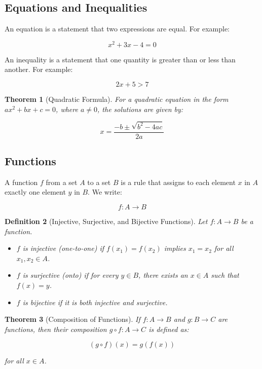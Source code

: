 \documentclass[12pt]{article}
\newif\ifDarkMode
\newcommand{\eqcolor}[1]{\ifDarkMode\textcolor{draculaPurple}{#1}\else#1\fi}
\newcommand{\varcolor}[1]{\ifDarkMode\textcolor{draculaGreen}{#1}\else#1\fi}
\newtheorem{theorem}{Theorem}[section]
\newtheorem{definition}[theorem]{Definition}
\begin{document}
\subsection{\textcolor{draculaYellow}{Equations and Inequalities}}

An equation is a statement that two expressions are equal. For example:

\[
\eqcolor{x^2 + 3x - 4 = 0}
\]

An inequality is a statement that one quantity is greater than or less than another. For example:

\[
\eqcolor{2x + 5 > 7}
\]

\begin{theorem}[Quadratic Formula]
For a quadratic equation in the form $\eqcolor{ax^2 + bx + c = 0}$, where $\varcolor{a \neq 0}$, the solutions are given by:

\[
\eqcolor{x = \frac{-b \pm \sqrt{b^2 - 4ac}}{2a}}
\]
\end{theorem}

\subsection{\textcolor{draculaYellow}{Functions}}

A function $\varcolor{f}$ from a set $\varcolor{A}$ to a set $\varcolor{B}$ is a rule that assigns to each element $\varcolor{x}$ in $\varcolor{A}$ exactly one element $\varcolor{y}$ in $\varcolor{B}$. We write:

\[
\eqcolor{f: A \to B}
\]

\begin{definition}[Injective, Surjective, and Bijective Functions]
Let $\varcolor{f: A \to B}$ be a function.
\begin{itemize}
    \item $\varcolor{f}$ is injective (one-to-one) if $\eqcolor{f(x_1) = f(x_2)}$ implies $\eqcolor{x_1 = x_2}$ for all $\varcolor{x_1, x_2 \in A}$.
    \item $\varcolor{f}$ is surjective (onto) if for every $\varcolor{y \in B}$, there exists an $\varcolor{x \in A}$ such that $\eqcolor{f(x) = y}$.
    \item $\varcolor{f}$ is bijective if it is both injective and surjective.
\end{itemize}
\end{definition}

\begin{theorem}[Composition of Functions]
If $\varcolor{f: A \to B}$ and $\varcolor{g: B \to C}$ are functions, then their composition $\varcolor{g \circ f: A \to C}$ is defined as:

\[
\eqcolor{(g \circ f)(x) = g(f(x))}
\]

for all $\varcolor{x \in A}$.
\end{theorem}
\end{document}
